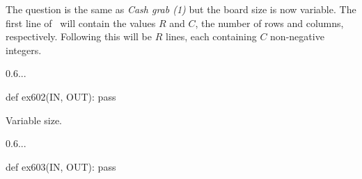
\clearpage


The question is the same as \emph{Cash grab (1)} but the board size is now variable. The
first line of \IN\ will contain the values $R$ and $C$, the number of rows and columns,
respectively. Following this will be $R$ lines, each containing $C$ non-negative integers.

\Sample

       {0.6}{...}

\Solution

\begin{pythoncode}
  def ex602(IN, OUT):
    pass
\end{pythoncode}



\clearpage


Variable size.

\Sample

       {0.6}{...}

\Solution

\begin{pythoncode}
  def ex603(IN, OUT):
    pass
\end{pythoncode}


